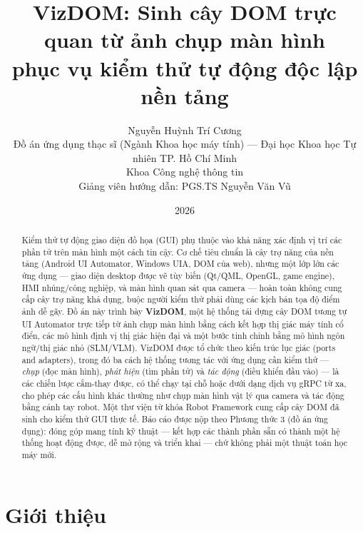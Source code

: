 \documentclass[11pt,a4paper]{article}
\title{\textbf{VizDOM: Sinh cây DOM trực quan từ ảnh chụp màn hình\\
phục vụ kiểm thử tự động độc lập nền tảng}}
\author{Nguyễn Huỳnh Trí Cương\\
\small Đồ án ứng dụng thạc sĩ (Ngành Khoa học máy tính) --- Đại học Khoa học Tự nhiên TP. Hồ Chí Minh\\
\small Khoa Công nghệ thông tin\\
\small Giảng viên hướng dẫn: PGS.TS Nguyễn Văn Vũ}
\date{2026}
\begin{document}
\maketitle

\begin{abstract}
\noindent
Kiểm thử tự động giao diện đồ họa (GUI) phụ thuộc vào khả năng xác định vị trí các
phần tử trên màn hình một cách tin cậy. Cơ chế tiêu chuẩn là cây trợ năng của nền
tảng (Android UI Automator, Windows UIA, DOM của web), nhưng một lớp lớn các ứng
dụng --- giao diện desktop được vẽ tùy biến (Qt/QML, OpenGL, game engine), HMI
nhúng/công nghiệp, và màn hình quan sát qua camera --- hoàn toàn không cung cấp cây
trợ năng khả dụng, buộc người kiểm thử phải dùng các kịch bản tọa độ điểm ảnh dễ
gãy. Đồ án này trình bày \textbf{VizDOM}, một hệ thống tái dựng cây DOM tương tự UI
Automator trực tiếp từ ảnh chụp màn hình bằng cách kết hợp thị giác máy tính cổ
điển, các mô hình định vị thị giác hiện đại và một bước tinh chỉnh bằng mô hình
ngôn ngữ/thị giác nhỏ (SLM/VLM). VizDOM được tổ chức theo kiến trúc lục giác (ports
and adapters), trong đó ba cách hệ thống tương tác với ứng dụng cần kiểm thử ---
\emph{chụp} (đọc màn hình), \emph{phát hiện} (tìm phần tử) và \emph{tác động} (điều
khiển đầu vào) --- là các chiến lược cắm-thay được, có thể chạy tại chỗ hoặc dưới
dạng dịch vụ gRPC từ xa, cho phép các cấu hình khác thường như chụp màn hình vật lý
qua camera và tác động bằng cánh tay robot. Một thư viện từ khóa Robot Framework
cung cấp cây DOM đã sinh cho kiểm thử GUI thực tế. Báo cáo được nộp theo Phương
thức 3 (đồ án ứng dụng): đóng góp mang tính kỹ thuật --- kết hợp các thành phần sẵn
có thành một hệ thống hoạt động được, dễ mở rộng và triển khai --- chứ không phải
một thuật toán học máy mới.
\end{abstract}

\newpage
\tableofcontents
\newpage

\section{Giới thiệu}
\end{document}
